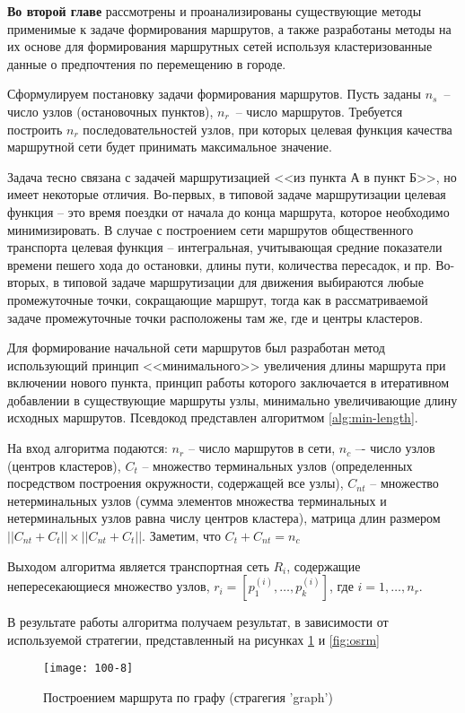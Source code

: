 \textbf{Во второй главе} рассмотрены и проанализированы существующие методы применимые к задаче формирования 
маршрутов, а также разработаны методы на их основе для формирования маршрутных сетей используя 
кластеризованные данные о предпочтения по перемещению в городе.

Сформулируем постановку задачи формирования маршрутов. Пусть заданы \( n_s \)~-- число узлов (остановочных 
пунктов), \( n_r \)~-- число маршрутов. Требуется построить \( n_r \) последовательностей узлов, при которых 
целевая функция качества маршрутной сети будет принимать максимальное значение. 

Задача тесно связана с задачей маршрутизацией <<из пункта А в пункт Б>>, но имеет некоторые отличия. 
Во-первых, в типовой задаче маршрутизации целевая функция – это время поездки от начала до конца маршрута, 
которое необходимо минимизировать. В случае с построением сети маршрутов общественного транспорта целевая 
функция -- интегральная, учитывающая средние показатели времени пешего хода до остановки, длины пути, 
количества пересадок, и пр. Во-вторых, в типовой задаче маршрутизации для движения выбираются любые 
промежуточные точки, сокращающие маршрут, тогда как в рассматриваемой задаче промежуточные точки 
расположены там же, где и центры кластеров.

Для формирование начальной сети маршрутов был разработан метод использующий принцип <<минимального>> 
увеличения длины маршрута при включении нового пункта, принцип работы которого заключается в итеративном 
добавлении в существующие маршруты узлы, минимально увеличивающие длину исходных маршрутов. Псевдокод 
представлен алгоритмом \ref{alg:min-length}.

На вход алгоритма подаются: \( n_r \) -- число маршрутов в сети, \( n_c \) –- число узлов (центров 
кластеров), \( C_t \) – множество терминальных узлов (определенных посредством построения окружности, 
содержащей все узлы), \( C_{nt} \) -- множество нетерминальных узлов (сумма элементов множества терминальных 
и нетерминальных узлов равна числу центров кластера), матрица длин размером 
\( ||{C_{nt}} + {C_{t}}|| \times ||{C_{nt}} + {C_{t}}|| \). Заметим, что \( C_t + C_{nt} = n_c \)

Выходом алгоритма является транспортная сеть \( R_i \), содержащие непересекающиеся множество узлов, 
\( r_{i} = [p_{1}^{(i)}, \dots, p_{k}^{(i)}] \), где \( i = 1, \dots, n_r \). 

В результате работы алгоритма получаем результат, в зависимости от используемой стратегии, представленный на 
рисунках \ref{fig:graph} и \ref{fig:osrm}
\begin{figure}[ht!]
    \centering
    \texttt{[image: 100-8]}
    \caption{Построением маршрута по графу (страгегия 'graph')}
    \label{fig:graph}
\end{figure}


